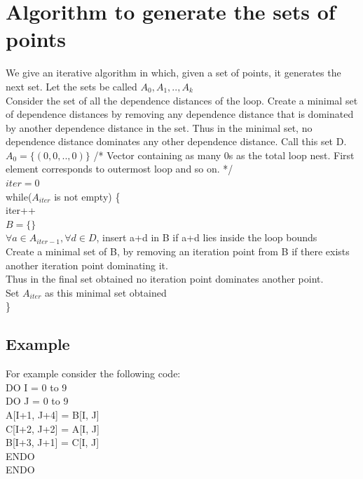 
\section{Algorithm to generate the sets of points}

We give an iterative algorithm in which, given a set of points, it generates the next set.
Let the sets be called $A_0, A_1, .. ,A_k$ \\

Consider the set of all the dependence distances of the loop. 
Create a minimal set of dependence distances by removing any dependence distance that is dominated by another dependence distance in the set.
Thus in the minimal set, no dependence distance dominates any other dependence distance.
Call this set D. \\

\noindent
$A_0 = \{(0,0,..,0)\}$ /* Vector containing as many 0s as the total loop nest. First element corresponds to outermost loop and so on. */ \\
$iter = 0$ \\
while($A_{iter}$ is not empty) \{ \\
\indent	iter++ \\
\indent	$B = \{\}$ \\
\indent	$ \forall a \in A_{iter-1}, \forall d \in D$, insert a+d in B if a+d lies inside the loop bounds\\
\indent	Create a minimal set of B, by removing an iteration point from B if there exists another iteration point dominating it.\\
\indent	Thus in the final set obtained no iteration point dominates another point.\\
\indent	Set $A_{iter}$ as this minimal set obtained\\
\} \\

\subsection{Example}

\noindent For example consider the following code: \\
DO I = 0 to 9 \\
\indent DO J = 0 to 9 \\
\indent \indent A[I+1, J+4] = B[I, J] \\
\indent \indent C[I+2, J+2] = A[I, J] \\
\indent \indent B[I+3, J+1] = C[I, J] \\
\indent ENDO \\
ENDO \\


